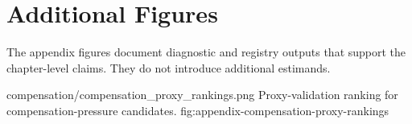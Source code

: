 \section{Additional Figures}
\label{app:additional-figures}

The appendix figures document diagnostic and registry outputs that support the chapter-level claims. They do not introduce additional estimands.

\thesisfigure
  {compensation/compensation_proxy_rankings.png}
  {Proxy-validation ranking for compensation-pressure candidates.}
  {fig:appendix-compensation-proxy-rankings}
